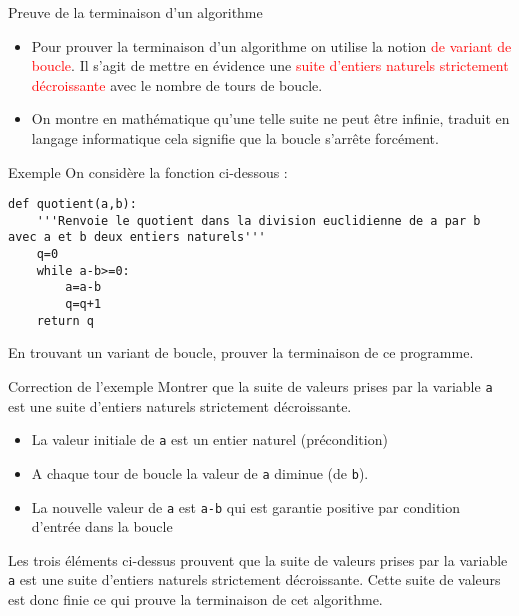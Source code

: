 \documentclass[10pt]{beamer}
\begin{document}
\begin{frame}
\mframe{\Specification}
\begin{alertblock}{Preuve de la terminaison d'un algorithme}
\begin{itemize}
\item Pour prouver la terminaison d'un algorithme on utilise la notion \textcolor{red}{de variant de boucle}. Il s'agit de mettre en évidence une \textcolor{red}{suite d'entiers naturels strictement décroissante} avec le nombre de tours de boucle. \\
\item<2->{On montre en mathématique qu'une telle suite ne peut être infinie, traduit en langage informatique cela signifie que la boucle s'arrête forcément.}
\end{itemize}
\end{alertblock}
\end{frame}

\begin{frame}[fragile]
\mframe{\Specification}
\begin{exampleblock}{Exemple}
On considère la fonction ci-dessous :
\begin{lstlisting}
def quotient(a,b):
	'''Renvoie le quotient dans la division euclidienne de a par b avec a et b deux entiers naturels'''
	q=0
	while a-b>=0:
		a=a-b
		q=q+1
	return q
\end{lstlisting}
 En trouvant un variant de boucle, prouver la terminaison de ce programme.
\end{exampleblock}
\end{frame}

\begin{frame}
\mframe{\Specification}
\begin{exampleblock}{Correction de l'exemple}
\textcolor{OliveGreen}{Montrer que la suite de valeurs prises par la variable \texttt{a} est une suite d'entiers naturels strictement décroissante.}
\begin{itemize}
\item<2->{\textcolor{OliveGreen}{La valeur initiale de \texttt{a} est un entier naturel (précondition)}}
\item<3->{\textcolor{OliveGreen}{A chaque tour de boucle la valeur de \texttt{a} diminue (de \texttt{b}).}}
\item<4->{\textcolor{OliveGreen}{La nouvelle valeur de \texttt{a} est \texttt{a-b} qui est garantie positive par condition d'entrée dans la boucle}}
\end{itemize}
\textcolor{OliveGreen}{Les trois éléments ci-dessus prouvent que la suite de valeurs prises par la variable \texttt{a} est une suite d'entiers naturels strictement décroissante. Cette suite de valeurs est donc finie ce qui prouve la terminaison de cet algorithme.}
\end{exampleblock}
\end{frame}
\end{document}
